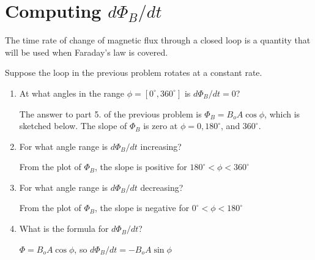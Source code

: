 \documentclass{article}
\begin{document}
\section{Computing $d\Phi_B/dt$}

The time rate of change of magnetic flux through a closed loop is a quantity that will be used when Faraday's law is covered.

Suppose the loop in the previous problem rotates at a constant rate.



\begin{enumerate}

  \item At what angles in the range $\phi=[0^\circ, 360^\circ]$ is $d\Phi_B/dt=0$?

        \ifsolutions
        The answer to part 5. of the previous problem is $\Phi_B=B_oA\cos\phi$, which is sketched below. The slope of $\Phi_B$ is zero at $\phi = 0, 180^\circ$, and $360^\circ$.

        
        \else
        \vskip 60pt
        \fi

  \item For what angle range is $d\Phi_B/dt$ increasing?

        \ifsolutions
        From the plot of $\Phi_B$, the slope is positive for $180^\circ \lt \phi \lt 360^\circ$
        \else
        \vskip 60pt
        \fi

  \item For what angle range is $d\Phi_B/dt$ decreasing?

        \ifsolutions
        From the plot of $\Phi_B$, the slope is negative for $0^\circ \lt \phi \lt 180^\circ$
        \else
        \vskip 60pt
        \fi

  \item What is the formula for $d\Phi_B/dt$?

        \ifsolutions
        $\Phi=B_oA\cos\phi$, so $d\Phi_B/dt = -B_oA\sin\phi$
        \else

        \fi

\end{enumerate}
\end{document}
